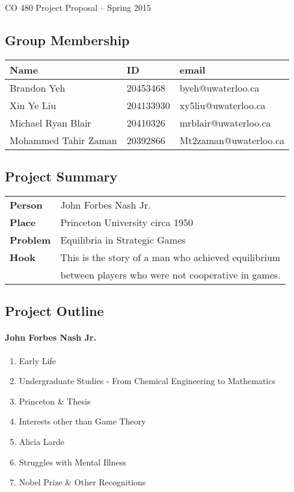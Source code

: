 \documentclass[11pt]{article}
\begin{document}
\begin{center}
{\Large CO 480 Project Proposal -- Spring 2015} 
\end{center}

\subsection*{Group Membership}
\begin{tabular}{|l|l|l|} \hline
Name & ID & email \\ \hline
Brandon Yeh & 20453468 & byeh@uwaterloo.ca\\ \hline
Xin Ye Liu & 204133930 & xy5liu@uwaterloo.ca\\ \hline
Michael Ryan Blair & 20410326 & mrblair@uwaterloo.ca \\ \hline
Mohammed Tahir Zaman & 20392866 & Mt2zaman@uwaterloo.ca\\ \hline
\end{tabular}

\subsection*{Project Summary}
\begin{tabular}{ll}
{\bf Person}  & John Forbes Nash Jr. \\
{\bf Place}   & Princeton University circa 1950 \\
{\bf Problem} & Equilibria in Strategic Games \\
{\bf Hook }   & This is the story of a man who achieved equilibrium\\  & between players who were not cooperative in games.
\end{tabular}

\subsection*{Project Outline}

\paragraph{John Forbes Nash Jr.}
\begin{enumerate}
	\item Early Life
	\item Undergraduate Studies - From Chemical Engineering to Mathematics
	\item Princeton \& Thesis
	\item Interests other than Game Theory
	\item Alicia Larde
	\item Struggles with Mental Illness
	\item Nobel Prize \& Other Recognitions
\end{enumerate}
\end{document}
